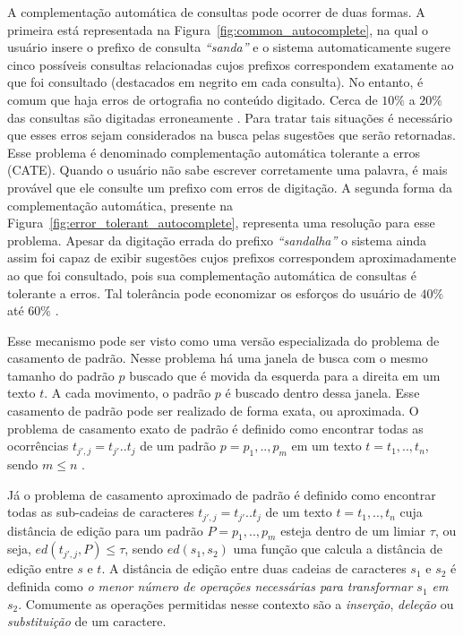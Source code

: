 A complementação automática de consultas pode ocorrer de duas formas. A primeira está representada na Figura~\ref{fig:common_autocomplete}, na qual o usuário insere o prefixo de consulta \textit{``sanda''} e o sistema automaticamente sugere cinco possíveis consultas relacionadas cujos prefixos correspondem exatamente ao que foi consultado (destacados em negrito em cada consulta). No entanto, é comum que haja erros de ortografia no conteúdo digitado. Cerca de $10\%$ a $20\%$ das consultas são digitadas erroneamente \citep{broder2009}. Para tratar tais situações é necessário que esses erros sejam considerados na busca pelas sugestões que serão retornadas. Esse problema é denominado complementação automática  tolerante a erros (CATE). Quando o usuário não sabe escrever corretamente uma palavra, é mais provável que ele consulte um prefixo com erros de digitação. A segunda forma da complementação automática, presente na Figura~\ref{fig:error_tolerant_autocomplete}, representa uma resolução para esse problema. Apesar da digitação errada do prefixo \textit{``sandalha''} o sistema ainda assim foi capaz de exibir sugestões cujos prefixos correspondem aproximadamente ao que foi consultado, pois sua complementação automática de consultas é tolerante a erros. Tal tolerância pode economizar os esforços do usuário de $40\%$ até $60\%$ \citep{ji2009efficient}.

Esse mecanismo pode ser visto como uma versão especializada do problema de casamento de padrão. Nesse problema há uma janela de busca com o mesmo tamanho do padrão $p$ buscado que é movida da esquerda para a direita em um texto $t$. A cada movimento, o padrão $p$ é buscado dentro dessa janela. Esse casamento de padrão pode ser realizado de forma exata, ou aproximada. O problema de casamento exato de padrão é definido como encontrar todas as ocorrências $t_{j',j} = t_{j'}..t_{j}$ de um padrão $p = p_{1},..,p_{m}$ em um texto $t = t_{1},..,t_{n}$, sendo $m \leq n$ \citep{farostringmatching2013}.  

Já o problema de casamento aproximado de padrão é definido como encontrar todas as sub-cadeias de caracteres $t_{j',j} = t_{j'}..t_{j}$ de um texto $t = t_{1},..,t_{n}$ cuja distância de edição para um padrão $P = p_{1},..,p_{m}$ esteja dentro de um limiar $\tau$, ou seja, $ed(t_{j',j}, P) \leq \tau$, sendo $ed(s_{1}, s_{2})$ uma função que calcula a distância de edição entre $s$ e $t$. A distância de edição entre duas cadeias de caracteres $s_{1}$ e $s_{2}$ é definida como \textit{o menor número de operações necessárias para transformar $s_{1}$ em $s_{2}$}. Comumente as operações permitidas nesse contexto são a \textit{inserção}, \textit{deleção} ou \textit{substituição} de um caractere.

